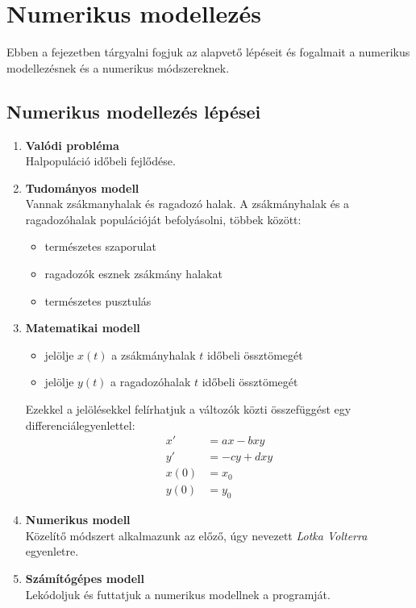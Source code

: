 \chapter{Numerikus modellezés}
Ebben a fejezetben tárgyalni fogjuk az alapvető lépéseit és fogalmait a numerikus modellezésnek és a numerikus módszereknek.

\section{Numerikus modellezés lépései}
\begin{enumerate}
    \item \textbf{Valódi probléma} \\
    Halpopuláció időbeli fejlődése.

    \item \textbf{Tudományos modell} \\
    Vannak zsákmanyhalak és ragadozó halak. A zsákmányhalak és a ragadozóhalak populációját befolyásolni, többek között:
    \begin{itemize}
        \item természetes szaporulat
        \item ragadozók esznek zsákmány halakat
        \item természetes pusztulás
    \end{itemize}

    \item \textbf{Matematikai modell}
    \begin{itemize}
        \item jelölje $x(t)$ a zsákmányhalak $t$ időbeli össztömegét
        \item jelölje $y(t)$ a ragadozóhalak $t$ időbeli össztömegét
    \end{itemize}
    Ezekkel a jelölésekkel felírhatjuk a változók közti összefüggést egy differenciálegyenlettel:
    \begin{align*}
        x' & = ax - bxy \\
        y' & = -cy + dxy \\
        x(0) & = x_{0} \\
        y(0) & = y_{0}
    \end{align*}

    \item \textbf{Numerikus modell} \\
    Közelítő módszert alkalmazunk az előző, úgy nevezett \textit{Lotka Volterra} egyenletre.

    \item \textbf{Számítógépes modell} \\
    Lekódoljuk és futtatjuk a numerikus modellnek a programját.
\end{enumerate}

